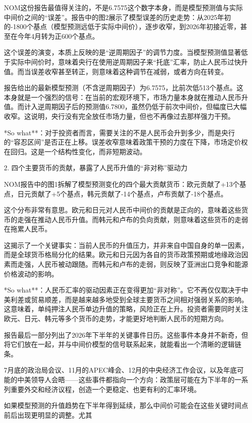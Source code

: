 \documentclass[11pt]{ctexart}
\begin{document}
NOM这份报告最值得关注的，不是6.7575这个数字本身，而是模型预测值与实际中间价之间的“误差”。报告中的图2展示了模型误差的历史走势：从2025年初的-1800个基点（模型预测远低于实际中间价），逐步收窄，到2026年初接近零，甚至在今年4月转为正600个基点。

这个误差的演变，本质上反映的是“逆周期因子”的调节力度。当模型预测值显著低于实际中间价时，意味着央行在使用逆周期因子来“托底”汇率，防止人民币过快升值。而当误差收窄甚至转正，则意味着这种调节在减弱，或者方向在转变。

报告给出的最新模型预测（不含逆周期因子）为6.7575，比前次低513个基点。这本身就是一个强烈的信号：在当前的宏观环境下，市场力量本身就在推动人民币升值。而计入逆周期因子后的预测值6.7800，虽然仍低于前次中间价，但幅度已大幅收窄。这说明，央行没有完全放任市场力量，但也不再像过去那样强力干预。

*So what**：对于投资者而言，需要关注的不是人民币会升到多少，而是央行的“容忍区间”是否正在上移。误差收窄意味着政策干预的力度在下降，市场定价权在回归。这是一个结构性变化，而非短期波动。

2. 四个主要货币的贡献，暴露了人民币升值的“非对称”驱动力

NOM报告中的图1拆解了模型预测变化的四个最大贡献货币：欧元贡献了+13个基点，日元贡献了+5个基点，韩元贡献了-14个基点，卢布贡献了-18个基点。

这个分布非常有意思。欧元和日元对人民币中间价的贡献是正向的，意味着这些货币的走强在推动人民币升值。而韩元和卢布的负向贡献，则意味着这些货币的走弱在拖累人民币。

这揭示了一个关键事实：当前人民币的升值压力，并非来自中国自身的单一因素，而是全球货币格局分化的结果。欧元和日元因为各自的货币政策预期或地缘政治因素而走强，人民币被动跟随。而韩元和卢布的走弱，则反映了亚洲出口竞争和能源价格波动的影响。

*So what**：人民币汇率的驱动因素正在变得更加“非对称”。它不再仅仅取决于中美利差或贸易顺差，而是越来越多地受到全球主要货币之间相对强弱关系的影响。这意味着，单纯押注人民币单边升值的策略，风险正在上升。投资者需要同时关注欧元、日元、韩元等多个货币的走势，才能更好地判断人民币的短期方向。

报告最后一部分列出了2026年下半年的关键事件日历。这些事件本身并不新奇，但将它们放在一起，并与中间价模型的信号联系起来，就能看出一个清晰的逻辑链条。

7月底的政治局会议、11月的APEC峰会、12月的中央经济工作会议，以及年底可能的中美领导人会晤——这些事件都指向一个方向：政策层可能在为下半年的一系列重要外交和经济议程，创造一个更稳定、也更有利的汇率环境。

如果模型预测的升值趋势在下半年得到延续，那么中间价可能会在这些关键时间点前后出现更明显的调整。尤其
\end{document}
